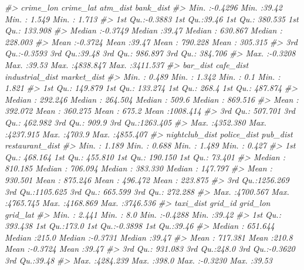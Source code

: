 \documentclass[
]{report}
\newenvironment{Shaded}{\begin{snugshade}}{\end{snugshade}}
\newcommand{\CommentTok}[1]{\textcolor[rgb]{0.56,0.35,0.01}{\textit{#1}}}
\theoremstyle{definition}
\theoremstyle{definition}
\theoremstyle{definition}
\theoremstyle{definition}
\theoremstyle{remark}
\begin{document}
\begin{Shaded}
\begin{Highlighting}[]
\CommentTok{\#\textgreater{}    crime\_lon         crime\_lat        atm\_dist          bank\_dist       }
\CommentTok{\#\textgreater{}  Min.   :{-}0.4296   Min.   :39.42   Min.   :   1.549   Min.   :   1.713  }
\CommentTok{\#\textgreater{}  1st Qu.:{-}0.3883   1st Qu.:39.46   1st Qu.: 380.535   1st Qu.: 133.908  }
\CommentTok{\#\textgreater{}  Median :{-}0.3749   Median :39.47   Median : 630.867   Median : 228.003  }
\CommentTok{\#\textgreater{}  Mean   :{-}0.3724   Mean   :39.47   Mean   : 790.228   Mean   : 305.315  }
\CommentTok{\#\textgreater{}  3rd Qu.:{-}0.3593   3rd Qu.:39.48   3rd Qu.: 986.897   3rd Qu.: 384.706  }
\CommentTok{\#\textgreater{}  Max.   :{-}0.3208   Max.   :39.53   Max.   :4838.847   Max.   :3411.537  }
\CommentTok{\#\textgreater{}     bar\_dist          cafe\_dist        industrial\_dist   market\_dist      }
\CommentTok{\#\textgreater{}  Min.   :   0.489   Min.   :   1.342   Min.   :   0.1   Min.   :   1.821  }
\CommentTok{\#\textgreater{}  1st Qu.: 149.879   1st Qu.: 133.274   1st Qu.: 268.4   1st Qu.: 487.874  }
\CommentTok{\#\textgreater{}  Median : 292.246   Median : 264.504   Median : 509.6   Median : 869.516  }
\CommentTok{\#\textgreater{}  Mean   : 392.072   Mean   : 360.275   Mean   : 675.2   Mean   :1008.414  }
\CommentTok{\#\textgreater{}  3rd Qu.: 507.701   3rd Qu.: 462.982   3rd Qu.: 909.9   3rd Qu.:1263.405  }
\CommentTok{\#\textgreater{}  Max.   :4352.380   Max.   :4237.915   Max.   :4703.9   Max.   :4855.407  }
\CommentTok{\#\textgreater{}  nightclub\_dist      police\_dist          pub\_dist        restaurant\_dist   }
\CommentTok{\#\textgreater{}  Min.   :   1.189   Min.   :   0.688   Min.   :   1.489   Min.   :   0.427  }
\CommentTok{\#\textgreater{}  1st Qu.: 468.164   1st Qu.: 455.810   1st Qu.: 190.150   1st Qu.:  73.401  }
\CommentTok{\#\textgreater{}  Median : 810.185   Median : 706.094   Median : 383.330   Median : 147.797  }
\CommentTok{\#\textgreater{}  Mean   : 930.501   Mean   : 875.246   Mean   : 496.472   Mean   : 223.875  }
\CommentTok{\#\textgreater{}  3rd Qu.:1256.269   3rd Qu.:1105.625   3rd Qu.: 665.599   3rd Qu.: 272.288  }
\CommentTok{\#\textgreater{}  Max.   :4700.567   Max.   :4765.745   Max.   :4168.869   Max.   :3746.536  }
\CommentTok{\#\textgreater{}    taxi\_dist           grid\_id         grid\_lon          grid\_lat    }
\CommentTok{\#\textgreater{}  Min.   :   2.441   Min.   :  8.0   Min.   :{-}0.4288   Min.   :39.42  }
\CommentTok{\#\textgreater{}  1st Qu.: 393.438   1st Qu.:173.0   1st Qu.:{-}0.3898   1st Qu.:39.46  }
\CommentTok{\#\textgreater{}  Median : 651.644   Median :215.0   Median :{-}0.3731   Median :39.47  }
\CommentTok{\#\textgreater{}  Mean   : 717.381   Mean   :210.8   Mean   :{-}0.3724   Mean   :39.47  }
\CommentTok{\#\textgreater{}  3rd Qu.: 931.083   3rd Qu.:248.0   3rd Qu.:{-}0.3620   3rd Qu.:39.48  }
\CommentTok{\#\textgreater{}  Max.   :4284.239   Max.   :398.0   Max.   :{-}0.3230   Max.   :39.53}
\end{Highlighting}
\end{Shaded}
\end{document}
